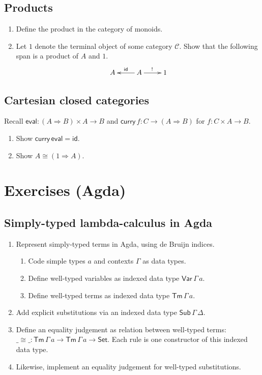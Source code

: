 \documentclass[a4paper,fleqn]{scrartcl}
\newcommand{\wttm}{\ensuremath{\mathsf{Tm}\,\Gamma\,a}}
\newcommand{\tid}{\mathsf{id}}
\newcommand{\To}{\Rightarrow}
\newcommand{\too}{\longrightarrow}
\newcommand{\tcurry}{\mathsf{curry}}
\newcommand{\teval}{\mathsf{eval}}
\begin{document}
\subsection{Products}

\newcommand{\C}{\mathcal{C}}

\begin{enumerate}
\item Define the product in the category of monoids.
\item Let $1$ denote the terminal object of some category $\C$.
  Show that the following span is a product of $A$ and $1$.
\[
\xymatrix{
  A & A \ar[l]_{\tid} \ar[r]^{!} & 1
}
\]
\end{enumerate}

\subsection{Cartesian closed categories}

Recall $\teval : (A \To B) \times A \too B$ and
$\tcurry\, f : C \too (A \To B)$ for $f : C \times A \too B$.
\begin{enumerate}
\item Show $\tcurry\,\teval = \tid$.
\item Show $A \cong (1 \To A)$.
\end{enumerate}

\clearpage

\section{Exercises (Agda)}

\subsection{Simply-typed lambda-calculus in Agda}

\begin{enumerate}
\item Represent simply-typed terms in Agda, using de Bruijn indices.
  \begin{enumerate}
  \item Code simple types $a$ and contexts $\Gamma$ as data types.
  \item Define well-typed variables as indexed data type
    $\mathsf{Var}\,\Gamma\,a$.
  \item Define well-typed terms as indexed data type \wttm.
  \end{enumerate}
\item Add explicit substitutions via an indexed data type
  $\mathsf{Sub}\,\Gamma\,\Delta$.
\item Define an equality judgement as relation between well-typed
  terms: ${\_{\cong}\_} : \wttm \to \wttm \to \mathsf{Set}$.
  Each rule is one constructor of this indexed data type.
\item Likewise, implement an equality judgement for well-typed substitutions.
\end{enumerate}
\end{document}
